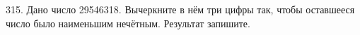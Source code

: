 315. Дано число 29546318. Вычеркните в нём три цифры так, чтобы оставшееся число было наименьшим нечётным. Результат запишите.\\
